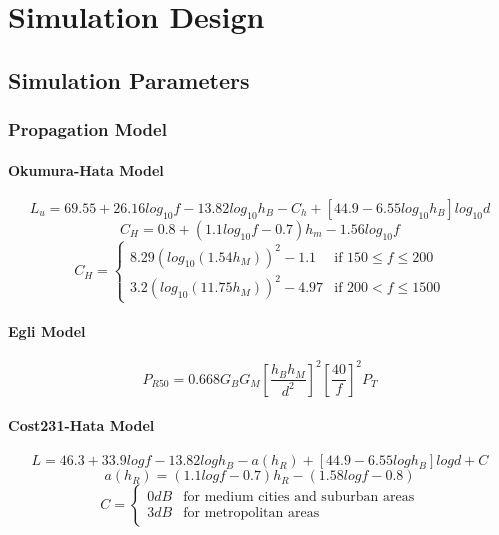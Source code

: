 \chapter{Simulation Design}
\section{Simulation Parameters}
\subsection{Propagation Model}
\subsubsection{Okumura-Hata Model}
\begin{equation}\label{eq:okumura}
L_{u}=69.55+26.16log_{10}f-13.82log_{10}h_{B}-C_{h}+[44.9-6.55log_{10}h_{B}]log_{10}d 
\end{equation}
\begin{equation}\label{eq:oksmall}
C_{H}=0.8+(1.1log_{10}f-0.7)h_{m}-1.56log_{10}f
\end{equation}
\begin{equation}\label{eq:oklarge}
C_{H}=
	\begin{cases}
	8.29(log_{10}(1.54h_{M}))^{2}-1.1 & \mbox{if } 150 \leq f \leq 200 \\
	3.2(log_{10}(11.75h_{M}))^{2}-4.97 & \mbox{if } 200 < f \leq 1500
	\end{cases}
\end{equation}

\subsubsection{Egli Model}
\begin{equation}
P_{R50}=0.668G_{B}G_{M}[\frac{h_{B}h_{M}}{d^{2}}]^{2}[\frac{40}{f}]^{2}P_{T}
\end{equation}

\subsubsection{Cost231-Hata Model}
\begin{equation}
L=46.3+33.9logf-13.82log{h_{B}}-a(h_{R})+[44.9-6.55log{h_{B}}]log{d}+C
\end{equation}
\begin{equation}
a(h_{R})=(1.1log{f}-0.7)h_{R}-(1.58log{f}-0.8)
\end{equation}
\begin{equation}
C=
	\begin{cases}
	0 dB & \mbox{for medium cities and suburban areas} \\
	3 dB & \mbox{for metropolitan areas}
	\end{cases}
\end{equation}

